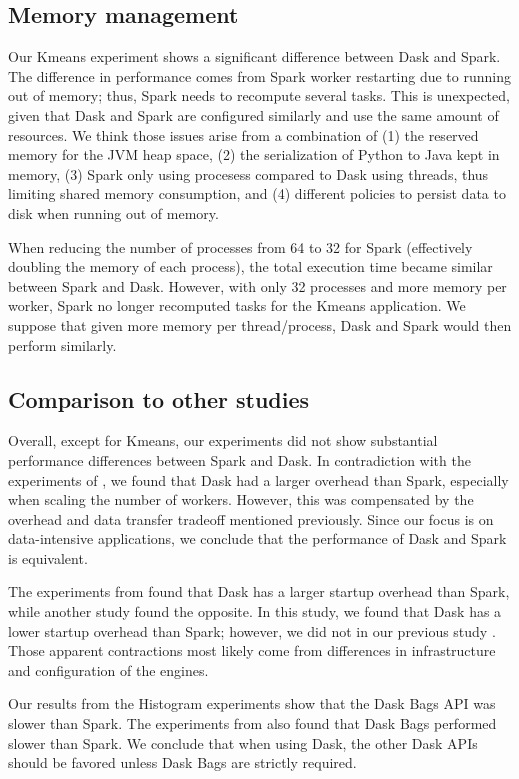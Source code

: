 \documentclass[conference]{IEEEtran}
\begin{document}
\subsection{Memory management}
Our Kmeans experiment shows a significant difference between Dask and Spark.
The difference in performance comes from Spark worker restarting due to running out of memory; thus, Spark needs to recompute several tasks.
This is unexpected, given that Dask and Spark are configured similarly and use the same amount of resources.
We think those issues arise from a combination of
(1) the reserved memory for the JVM heap space,
(2) the serialization of Python to Java kept in memory,
(3) Spark only using procesess compared to Dask using threads, thus limiting shared memory consumption,
and (4) different policies to persist data to disk when running out of memory.

When reducing the number of processes from 64 to 32 for Spark (effectively doubling the memory of each process), the total execution time became similar between Spark and Dask.
However, with only 32 processes and more memory per worker, Spark no longer recomputed tasks for the Kmeans application.
We suppose that given more memory per thread/process, Dask and Spark would then perform similarly.

\subsection{Comparison to other studies}
Overall, except for Kmeans, our experiments did not show substantial performance differences between Spark and Dask.
In contradiction with the experiments of \cite{Mehta:17}, we found that Dask had a larger overhead than Spark, especially when scaling the number of workers.
However, this was compensated by the overhead and data transfer tradeoff mentioned previously.
Since our focus is on data-intensive applications, we conclude that the performance of Dask and Spark is equivalent.

The experiments from \cite{Mehta:17} found that Dask has a larger startup overhead than Spark, while another study \cite{8588652} found the opposite.
In this study, we found that Dask has a lower startup overhead than Spark; however, we did not in our previous study \cite{8943502}.
Those apparent contractions most likely come from differences in infrastructure and configuration of the engines.

Our results from the Histogram experiments show that the Dask Bags API was slower than Spark.
The experiments from \cite{10.1145/3225058.3225128} also found that Dask Bags performed slower than Spark.
We conclude that when using Dask, the other Dask APIs should be favored unless Dask Bags are strictly required.
\end{document}
